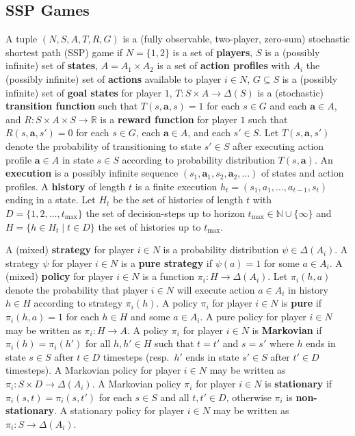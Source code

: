 \documentclass[10pt]{article}
\theoremstyle{plain}
\newcommand{\vect}[1]{\bm{#1}}
\begin{document}
\subsection{SSP Games}
A tuple $(N, S, A, T, R, G)$ is a (fully observable, two-player, zero-sum) stochastic shortest path (SSP) game if
$N = \{ 1, 2 \}$ is a set of \textbf{players},
$S$ is a (possibly infinite) set of \textbf{states},
$A = A_{1} \times A_{2}$ is a set of \textbf{action profiles} with $A_{i}$ the (possibly infinite) set of \textbf{actions} available to player $i \in N$,
$G \subseteq S$ is a (possibly infinite) set of \textbf{goal states} for player $1$,
$T : S \times A \to \Delta(S)$ is a (stochastic) \textbf{transition function} such that $T(s, \vect{a}, s) = 1$ for each $s \in G$ and each $\vect{a} \in A$,
and $R : S \times A \times S \to \mathbb{R}$ is a \textbf{reward function} for player $1$ such that $R(s, \vect{a}, s') = 0$ for each $s \in G$, each $\vect{a} \in A$, and each $s' \in S$.
Let $T(s, \vect{a}, s')$ denote the probability of transitioning to state $s' \in S$ after executing action profile $\vect{a} \in A$ in state $s \in S$ according to probability distribution $T(s, \vect{a})$.
An \textbf{execution} is a possibly infinite sequence $(s_{1}, \vect{a}_{1}, s_{2}, \vect{a}_{2}, \dots)$ of states and action profiles.
A \textbf{history} of length $t$ is a finite execution $h_{t} = (s_{1}, a_{1}, \dots, a_{t-1}, s_{t})$ ending in a state.
Let $H_{t}$ be the set of histories of length $t$ with $D = \{ 1, 2, \dots, t_{\max} \}$ the set of decision-steps up to horizon $t_{\max} \in \mathbb{N} \cup \{ \infty \}$ and $H = \{ h \in H_{t} \mid t \in D \}$ the set of histories up to $t_{\max}$.

A (mixed) \textbf{strategy} for player $i \in N$ is a probability distribution $\psi \in \Delta(A_{i})$.
A strategy $\psi$ for player $i \in N$ is a \textbf{pure strategy} if $\psi(a) = 1$ for some $a \in A_{i}$.
A (mixed) \textbf{policy} for player $i \in N$ is a function $\pi_{i} : H \to \Delta(A_{i})$.
Let $\pi_{i}(h, a)$ denote the probability that player $i \in N$ will execute action $a \in A_{i}$ in history $h \in H$ according to strategy $\pi_{i}(h)$.
A policy $\pi_{i}$ for player $i \in N$ is \textbf{pure} if $\pi_{i}(h, a) = 1$ for each $h \in H$ and some $a \in A_{i}$.
A pure policy for player $i \in N$ may be written as $\pi_{i} : H \to A$.
A policy $\pi_{i}$ for player $i \in N$ is \textbf{Markovian} if $\pi_{i}(h) = \pi_{i}(h')$ for all $h, h' \in H$ such that $t = t'$ and $s = s'$ where $h$ ends in state $s \in S$ after $t \in D$ timesteps (resp.\ $h'$ ends in state $s' \in S$ after $t' \in D$ timesteps).
A Markovian policy for player $i \in N$ may be written as $\pi_{i} : S \times D \to \Delta(A_{i})$.
A Markovian policy $\pi_{i}$ for player $i \in N$ is \textbf{stationary} if $\pi_{i}(s, t) = \pi_{i}(s, t')$ for each $s \in S$ and all $t, t' \in D$, otherwise $\pi_{i}$ is \textbf{non-stationary}.
A stationary policy for player $i \in N$ may be written as $\pi_{i} : S \to \Delta(A_{i})$.
\end{document}
